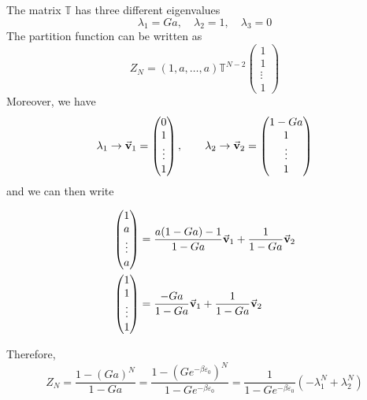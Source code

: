 \documentclass[../main/main.tex]{subfiles}
\begin{document}
The matrix \( \mathbb{T} \) has three different eigenvalues
\begin{equation}
  \lambda _1 = Ga, \quad \lambda _2 =1, \quad \lambda _3 = 0
\end{equation}
The partition function can be written as
\begin{equation}
  Z_N = (1,a, \dots,a) \mathbb{T}^{N-2} \begin{pmatrix}
  1 \\
  1 \\
  \vdots \\
  1
  \end{pmatrix}
\end{equation}
Moreover, we have 
\begin{equation*}
  \lambda _1 \rightarrow \va{v}_1 = \begin{pmatrix}
  0 \\
  1 \\
  \vdots \\
  1
  \end{pmatrix},
  \qquad
  \lambda _2 \rightarrow \va{v}_2 = \begin{pmatrix}
  1-Ga \\
  1 \\
  \vdots \\
  1
  \end{pmatrix}
\end{equation*}
and we can then write
\begin{subequations*}
\begin{align*}
  \begin{pmatrix}
  1 \\
  a \\
  \vdots \\
  a
\end{pmatrix}  &= \frac{a(1-Ga)-1}{1-Ga} \va{v}_1 + \frac{1}{1-Ga}\va{v}_2 \\
\begin{pmatrix}
1 \\
1 \\
\vdots \\
1
\end{pmatrix}  &= \frac{-Ga}{1-Ga} \va{v}_1 + \frac{1}{1-Ga}\va{v}_2
\end{align*}
\end{subequations*}
Therefore,
\begin{equation}
  Z_N = \frac{1-(Ga)^N}{1-Ga} = \frac{1-(G e^{-\beta \varepsilon _0} )^N}{1-G e^{-\beta \varepsilon _0} }
  = \frac{1}{1-G e^{-\beta \varepsilon _0} } (-\lambda _1^N + \lambda _2^N)
\end{equation}
\end{document}
